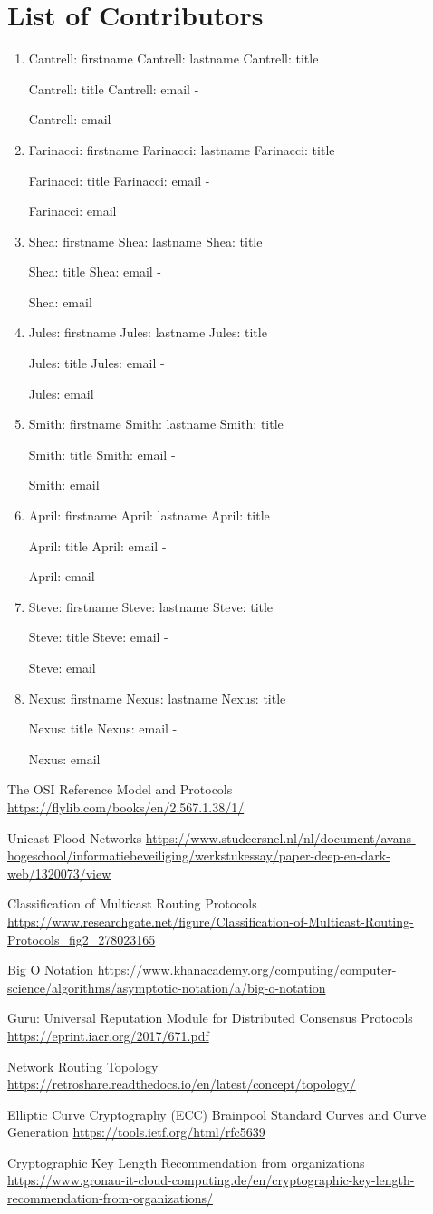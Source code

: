 \documentclass[11pt]{article}
\newcommand{\printcontributor}[1]{
  \begingroup
  \parindent 0pt
  \usevalue #1: firstname
  \space
  \usevalue #1: lastname
  \ifattribute #1: title {\par}{\relax}
  \usevalue #1: title
  \ifattribute #1: email {\space-\space} {\par\relax}
  \usevalue #1: email
  \endgroup
}
\begin{document}
\newpage

\section{List of Contributors}

\begingroup
\parindent 0pt
\parskip  8pt

\begin{enumerate}
\item 
\printcontributor{Cantrell}

\item
\printcontributor{Farinacci}

\item
\printcontributor{Shea}

\item
\printcontributor{Jules}

\item
\printcontributor{Smith}

\item
\printcontributor{April}

\item
\printcontributor{Steve}

\item
\printcontributor{Nexus}
\end{enumerate}

\endgroup


\pagebreak
\begin{thebibliography}{7}



The OSI Reference Model and Protocols
\url{https://flylib.com/books/en/2.567.1.38/1/}

Unicast Flood Networks
\url{https://www.studeersnel.nl/nl/document/avans-hogeschool/informatiebeveiliging/werkstukessay/paper-deep-en-dark-web/1320073/view}

Classification of Multicast Routing Protocols
\url{https://www.researchgate.net/figure/Classification-of-Multicast-Routing-Protocols_fig2_278023165}

Big O Notation
\url{https://www.khanacademy.org/computing/computer-science/algorithms/asymptotic-notation/a/big-o-notation}

Guru: Universal Reputation Module for Distributed Consensus Protocols
\url{https://eprint.iacr.org/2017/671.pdf}

Network Routing Topology
\url{https://retroshare.readthedocs.io/en/latest/concept/topology/}

Elliptic Curve Cryptography (ECC) Brainpool Standard Curves and Curve Generation
\url{https://tools.ietf.org/html/rfc5639}

Cryptographic Key Length Recommendation from organizations
\url{https://www.gronau-it-cloud-computing.de/en/cryptographic-key-length-recommendation-from-organizations/}

\end{thebibliography}
\end{document}
